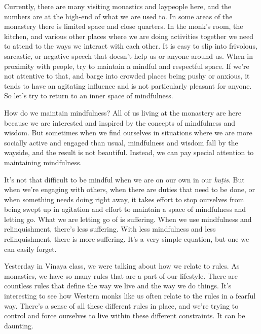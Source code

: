 
Currently, there are many visiting monastics and laypeople here, and 
the numbers are at the high-end of what we are used to. In some areas 
of the monastery there is limited space and close quarters. In the 
monk's room, the kitchen, and various other places where we are doing 
activities together we need to attend to the ways we interact with each 
other. It is easy to slip into frivolous, sarcastic, or negative speech 
that doesn't help us or anyone around us. When in proximity with 
people, try to maintain a mindful and respectful space. If we're not 
attentive to that, and barge into crowded places being pushy or 
anxious, it tends to have an agitating influence and is not 
particularly pleasant for anyone. So let's try to return to an inner 
space of mindfulness.

How do we maintain mindfulness? All of us living at the monastery are 
here because we are interested and inspired by the concepts of 
mindfulness and wisdom. But sometimes when we find ourselves in 
situations where we are more socially active and engaged than usual, 
mindfulness and wisdom fall by the wayside, and the result is not 
beautiful. Instead, we can pay special attention to maintaining 
mindfulness.

It's not that difficult to be mindful when we are on our own in our 
\emph{kuṭis}. But when we're engaging with others, when there are 
duties that need to be done, or when something needs doing right away, 
it takes effort to stop ourselves from being swept up in agitation and 
effort to maintain a space of mindfulness and letting go. What we are 
letting go of is suffering. When we use mindfulness and relinquishment, 
there's less suffering. With less mindfulness and less relinquishment, 
there is more suffering. It's a very simple equation, but one we can 
easily forget.


Yesterday in Vinaya class, we were talking about how we relate to 
rules. As monastics, we have so many rules that are a part of our 
lifestyle. There are countless rules that define the way we live and 
the way we do things. It's interesting to see how Western monks like us 
often relate to the rules in a fearful way. There's a sense of all 
these different rules in place, and we're trying to control and force 
ourselves to live within these different constraints. It can be 
daunting.

